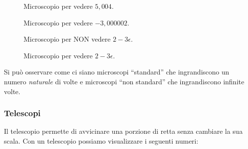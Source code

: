\begin{figure}[h]
\begin{inaccessibleblock}

\begin{minipage}{.48\linewidth}
 \begin{center}
\microscopioa
 \end{center}
\caption{Microscopio per vedere \(5,004\).} \label{fig:microscopioa}
\end{minipage}
\hfill
\begin{minipage}{.48\linewidth}
 \begin{center}
\microscopiob
 \end{center}
\caption{Microscopio per vedere \(-3,000002\).} \label{fig:microscopiob}
\end{minipage}

\end{inaccessibleblock}
\end{figure}
 
\begin{figure}[h]
\begin{inaccessibleblock}

\begin{minipage}{.48\linewidth}
 \begin{center}
\microscopioc
 \end{center}
\caption{Microscopio per NON vedere \(2-3\epsilon\).} \label{fig:microscopioc}
\end{minipage}
\hfill
\begin{minipage}{.48\linewidth}
 \begin{center}
\microscopiod
 \end{center}
\caption{Microscopio per vedere \(2-3\epsilon\).} \label{fig:microscopiod}
\end{minipage}

\end{inaccessibleblock}
\end{figure}
 
Si può osservare come ci siano microscopi ``standard'' che ingrandiscono un 
numero \emph{naturale} di volte e microscopi ``non standard'' che 
ingrandiscono 
infinite volte.

\subsubsection{Telescopi}
\label{subsec:insnum_microscopio}

Il telescopio permette di avvicinare una porzione di retta senza cambiare la 
sua scala. 
Con un telescopio possiamo visualizzare i seguenti numeri:

